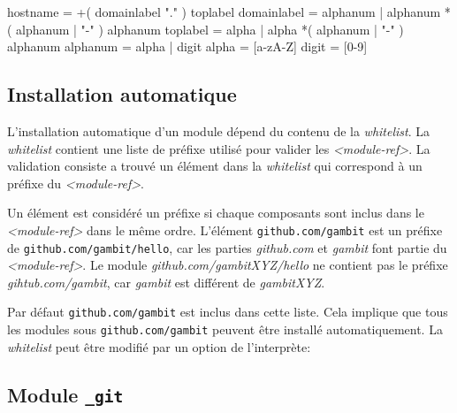 \begin{center}
  \begin{mplisting}{0.9}
hostname      = +( domainlabel "." ) toplabel
domainlabel   = alphanum | alphanum *( alphanum | "-" ) alphanum
toplabel      = alpha | alpha *( alphanum | "-" ) alphanum
alphanum      = alpha | digit
alpha         = [a-zA-Z]
digit         = [0-9]
\end{mplisting}
  \label{lst:hostname->grammar}
\end{center}


\subsection{Installation automatique}
%
L'installation automatique d'un module dépend du contenu de la
\textit{whitelist}.  La \textit{whitelist} contient une liste de préfixe
utilisé pour valider les \textit{<module-ref>}. La validation consiste
a trouvé un élément dans la \textit{whitelist} qui correspond à un
préfixe du \textit{<module-ref>}.

Un élément est considéré un préfixe si chaque composants sont inclus dans le
\textit{<module-ref>} dans le même ordre. L'élément \texttt{github.com/gambit}
est un préfixe de \texttt{github.com/gambit/hello}, car les parties
\textit{github.com} et \textit{gambit} font partie du \textit{<module-ref>}. Le
module \textit{github.com/gambitXYZ/hello} ne contient pas le préfixe
\textit{gihtub.com/gambit}, car \textit{gambit} est différent de
\textit{gambitXYZ}.


Par défaut \texttt{github.com/gambit} est inclus dans cette liste. 
Cela implique que tous les modules sous \texttt{github.com/gambit}
peuvent être installé automatiquement. La \textit{whitelist} peut
être modifié par un option de l'interprète:

\begin{center}
\end{center}



\subsection{Module \texttt{\_git}}


